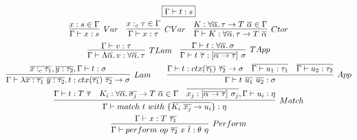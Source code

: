 \documentclass[acmsmall,review,screen]{acmart}
\newcommand{\mathframebox}[1]{\framebox{$\displaystyle #1$}}
\newcommand{\ap}{~}
\begin{document}
\begin{figure}
    \begin{gather*}
        \mathframebox{\Gamma\vdash t : s} \\
        \begin{array}{ccc}
            \infer[Var]{\Gamma\vdash x : s}{x : s \in \Gamma} &
            \infer[CVar]{\Gamma\vdash x : \tau}{x :_c \tau \in \Gamma} &
            \infer[Ctor]{\Gamma\vdash K : \forall \overline{\alpha}\ldotp \tau\to T\ap\overline{\alpha}}{K : \forall \overline{\alpha}\ldotp \tau\to T\ap\overline{\alpha} \in \Gamma} %
        \end{array} \\
        \begin{array}{cc}
            \infer[TLam]{
                \Gamma\vdash\Lambda\overline{\alpha}\ldotp v : \forall\overline{\alpha}\ldotp\tau
            }{
                \Gamma\vdash v : \tau
            } &
            \infer[TApp]{
                \Gamma\vdash t\ap\overline{\tau} : [\overline{\alpha\to\tau}]\ap\sigma
            }{
                \Gamma \vdash t : \forall\overline{\alpha}\ldotp \sigma
            }
        \end{array} \\
        \infer[Lam]{
            \Gamma\vdash \lambda \overline{x : \tau_1} ~ \overline{y : \tau_2} \ldotp t : ctx(\overline{\tau_1}) ~ \overline{\tau_2} \to \sigma
        }{
            \overline{x :_c \tau_1}, \overline{y : \tau_2}, \Gamma\vdash t : \sigma
        }
        \text{\hspace{2em}}
        \infer[App]{
            \Gamma\vdash t \ap \overline{u_1} \ap \overline{u_2} : \sigma
        } {
            \Gamma\vdash t : ctx(\overline{\tau_1})~\overline{\tau_2}\to\sigma
            &
            \overline{\Gamma\vdash u_1 : \tau_1}
            &
            \overline{\Gamma\vdash u_2 : \tau_2}
        }\\
        \infer[Match]{
            \Gamma\vdash match ~ t ~with ~\{ \overline{K_i\ap \overline{x_j} \to u_i }\} : \eta
        }{
            \Gamma\vdash t : T \ap\overline{\tau} &
            K_i : \forall \overline{\alpha}\ldotp \overline{\sigma_j} \to T\ap\overline{\alpha} \in \Gamma &
            \overline{x_j : [\overline{\alpha\to\tau}]\ap \sigma_j}, \Gamma \vdash u_i : \eta
        }\\
        \infer[Perform]{
            \Gamma\vdash perform \ap op\ap \overline{\tau_2}\ap x\ap \overline{t} : \theta\ap\eta
        }{
            \Gamma\vdash x : T\ap \overline{\tau_1} &
}
\end{gather*}
\end{figure}
\end{document}

